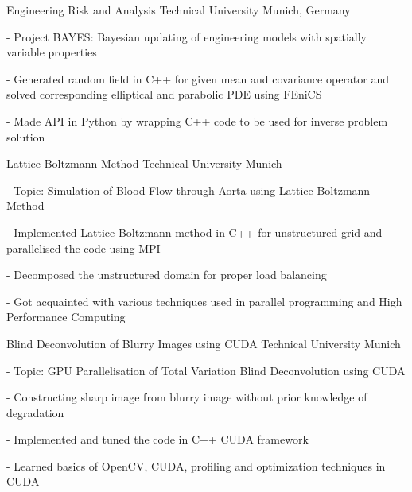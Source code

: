 \documentclass[helvetica,english,logo,notitle,totpages,utf8]{europecv2013}
\begin{document}
\begin{europecv}

{Engineering Risk and Analysis}
{Technical University Munich, Germany}
{
    - Project BAYES: Bayesian updating of engineering models with spatially variable properties \par
    - Generated random field in C++ for given mean and covariance operator and solved corresponding elliptical and parabolic PDE using FEniCS \par
    - Made API in Python by wrapping C++ code to be used for inverse problem solution
}



 {Lattice Boltzmann Method} {Technical University Munich}{
    - Topic: Simulation of Blood Flow through Aorta using Lattice Boltzmann Method \par
    - Implemented Lattice Boltzmann method in C++ for unstructured grid and parallelised the code using MPI \par
    - Decomposed the unstructured domain for proper load balancing \par
    - Got acquainted with various techniques used in parallel programming and High Performance Computing
}


 {Blind Deconvolution of Blurry Images using CUDA} {Technical University Munich}{
    - Topic: GPU Parallelisation of Total Variation Blind Deconvolution using CUDA \par
    - Constructing sharp image from blurry image without prior knowledge of degradation \par
    - Implemented and tuned the code in C++ CUDA framework \par
    - Learned basics of OpenCV, CUDA, profiling and optimization techniques in CUDA
}


\end{europecv}
\end{document}
